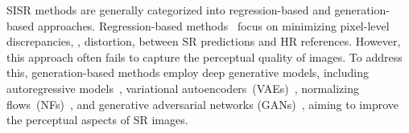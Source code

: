 \documentclass[10pt,twocolumn,letterpaper]{article}
\begin{document}
SISR methods are generally categorized into regression-based and generation-based approaches.   Regression-based methods~\cite{lim2017enhanced,zhang2018residual,liang2021swinir,chen2021learning}  focus on minimizing pixel-level discrepancies, \ie, distortion, between SR predictions and HR references. However, this approach often fails to capture the perceptual quality of images. To address this, generation-based methods employ deep generative models,  including autoregressive models~\cite{oord-arxiv-2016,oord-nips-2016}, variational autoencoders~(VAEs)~\cite{Kingma2013,vahdat2021nvae}, normalizing flows~(NFs)~\cite{dinh2016density,Kingma2018}, and generative adversarial networks (GANs)~\cite{goodfellow2014generative,karras2018ProGAN,radford2015unsupervised, liang2022details},  aiming to improve the perceptual aspects of SR images.

\end{document}
